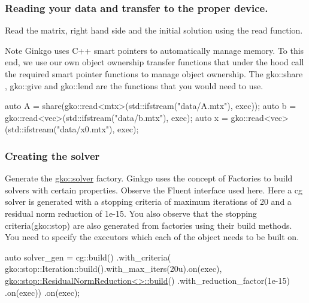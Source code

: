 \label{_Readingyourdataandtransfertotheproperdevice}%
 \subsubsection*{Reading your data and transfer to the proper device.}

Read the matrix, right hand side and the initial solution using the read function. \begin{DoxyNote}{Note}
Ginkgo uses C++ smart pointers to automatically manage memory. To this end, we use our own object ownership transfer functions that under the hood call the required smart pointer functions to manage object ownership. The gko\+::share , gko\+::give and gko\+::lend are the functions that you would need to use.
\end{DoxyNote}

\begin{DoxyCode}
\textcolor{keyword}{auto} A = share(gko::read<mtx>(std::ifstream(\textcolor{stringliteral}{"data/A.mtx"}), exec));
\textcolor{keyword}{auto} b = gko::read<vec>(std::ifstream(\textcolor{stringliteral}{"data/b.mtx"}), exec);
\textcolor{keyword}{auto} x = gko::read<vec>(std::ifstream(\textcolor{stringliteral}{"data/x0.mtx"}), exec);
\end{DoxyCode}


\label{_Creatingthesolver}%
 \subsubsection*{Creating the solver}

Generate the \hyperlink{namespacegko_1_1solver}{gko\+::solver} factory. Ginkgo uses the concept of Factories to build solvers with certain properties. Observe the Fluent interface used here. Here a cg solver is generated with a stopping criteria of maximum iterations of 20 and a residual norm reduction of 1e-\/15. You also observe that the stopping criteria(gko\+::stop) are also generated from factories using their build methods. You need to specify the executors which each of the object needs to be built on.


\begin{DoxyCode}
\textcolor{keyword}{auto} solver\_gen =
    cg::build()
        .with\_criteria(
            gko::stop::Iteration::build().with\_max\_iters(20u).on(exec),
            \hyperlink{classgko_1_1stop_1_1ResidualNormReduction}{gko::stop::ResidualNormReduction<>::build}()
                .with\_reduction\_factor(1e-15)
                .on(exec))
        .on(exec);
\end{DoxyCode}


